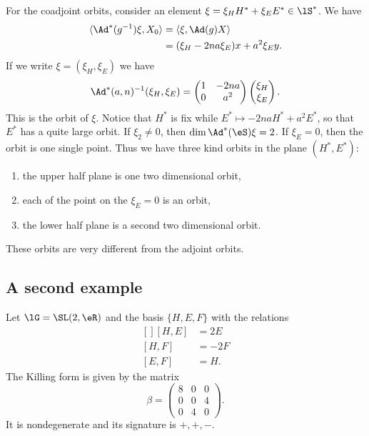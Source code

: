For the coadjoint orbits, consider an element $\xi=\xi_HH^*+\xi_EE^*\in\lS^*$. We have
\begin{equation}
	\begin{aligned}[]
		\langle \Ad^*(g^{-1})\xi, X_0\rangle &=\langle \xi, \Ad(g)X\rangle \\
			&=(\xi_H-2na\xi_E)x+a^2\xi_Ey.
	\end{aligned}
\end{equation}
If we write $\xi=(\xi_H,\xi_E)$ we have
\begin{equation}
	\Ad^*(a,n)^{-1}(\xi_H,\xi_E)=\begin{pmatrix}
		1	&	-2na	\\ 
		0	&	a^2	
	\end{pmatrix}\begin{pmatrix}
		\xi_H	\\ 
		\xi_E	
	\end{pmatrix}.
\end{equation}
This is the orbit of $\xi$. Notice that $H^*$ is fix while $E^*\mapsto -2na H^*+a^2E^*$, so that $E^*$ has a quite large orbit. If $\xi_2\neq 0$, then $\dim\Ad^*(\eS)\xi=2$. If $\xi_E=0$, then the orbit is one single point. Thus we have three kind orbits in the plane $(H^*,E^*)$:
\begin{enumerate}

	\item
		the upper half plane is one two dimensional orbit,
	\item
		each of the point on the $\xi_E=0$ is an orbit,
	\item
		the lower half plane is a second two dimensional orbit.
\end{enumerate}
These orbits are very different from the adjoint orbits.

\subsection{A second example}

Let $\lG=\SL(2,\eR)$ and the basis $\{ H,E,F \}$ with the relations
\begin{equation}
	\begin{aligned}[]
		[H,E]&=2E\\
		[H,F]&=-2F\\
		[E,F]&=H.
	\end{aligned}
\end{equation}
The Killing form is given by the matrix
\begin{equation}
	\beta=\begin{pmatrix}
		8	&	0	&	0	\\
		0	&	0	&	4	\\
		0	&	4	&	0
	\end{pmatrix}.
\end{equation}
It is nondegenerate and its signature is $+,+,-$.

